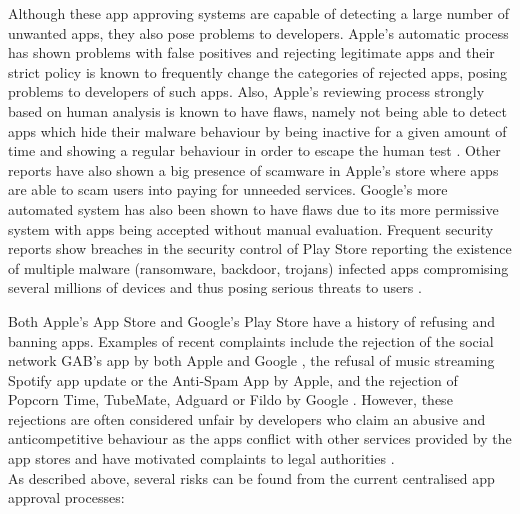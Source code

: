 Although these app approving systems are capable of detecting a large number of unwanted apps, they also pose problems to developers. Apple's automatic process has shown problems with false positives and rejecting legitimate apps \cite{AppleInsiderWebsite} and their strict policy is known to frequently change the categories of rejected apps, posing problems to developers of such apps. Also, Apple's reviewing process strongly based on human analysis is known to have flaws, namely not being able to detect apps which hide their malware behaviour by being inactive for a given amount of time and showing a regular behaviour in order to escape the human test \cite{AppleFlaws1}. Other reports \cite{AppleFlaws2} have also shown a big presence of scamware in Apple's store where apps are able to scam users into paying for unneeded services. Google's more automated system has also been shown to have flaws \cite{AppleApprovalFortune} due to its more permissive system with apps being accepted without manual evaluation. Frequent security reports show breaches in the security control of Play Store reporting the existence of multiple malware (ransomware, backdoor, trojans) infected apps compromising several millions of devices and thus posing serious threats to users \cite{GoogleMalware1, GoogleMalware2, GoogleMalware3}.

Both Apple's App Store and Google's Play Store have a history of refusing and banning apps. Examples of recent complaints include the rejection of the social network GAB's app by both Apple and Google \cite{AppRefusedGAB}, the refusal of music streaming Spotify app update \cite{AppleRefuseSpotify} or the Anti-Spam App \cite{AppleRefuseTRIAD} by Apple, and the rejection of Popcorn Time, TubeMate, Adguard or Fildo by Google \cite{GoogleBannedApps}. However, these rejections are often considered unfair by developers who claim an abusive and anticompetitive behaviour as the apps conflict with other services provided by the app stores and have motivated complaints to legal authorities \cite{AntiCompetitiveClaim}. \\

As described above, several risks can be found from the current centralised app approval processes:

